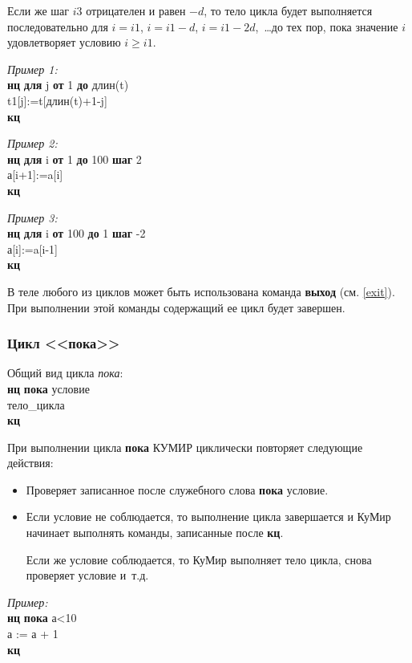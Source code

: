 Если же шаг $i3$ отрицателен и равен $-d$, то тело цикла будет выполняется последовательно для $i=i1$, $i=i1-d$, $i=i1-2d$,~\dots до тех пор, пока значение $i$ удовлетворяет условию $i \ge i1$.

\emph{Пример 1:}\\
{\sffamily
\textbf{нц} \textbf{для} j \textbf{от} 1 \textbf{до} длин(t)\\
\otstup t1[j]:=t[длин(t)+1-j]\\
\textbf{кц}
}

\emph{Пример 2:}\\
{\sffamily
\textbf{нц} \textbf{для} i \textbf{от} 1 \textbf{до} 100 \textbf{шаг} 2\\
\otstup а[i+1]:=a[i]\\
\textbf{кц}
}

\emph{Пример 3:}\\
{\sffamily
\textbf{нц} \textbf{для} i \textbf{от} 100 \textbf{до} 1 \textbf{шаг} -2\\
\otstup а[i]:=a[i-1]\\
\textbf{кц}
}

	В теле любого из циклов может быть использована команда \textbf{выход} (см. \ref{exit}). При выполнении этой команды содержащий ее цикл будет завершен.

\subsubsection[Цикл ''пока'']{Цикл <<пока>>}

Общий вид цикла \emph{пока}:\\
{\sffamily
\textbf{нц} \textbf{пока} условие\\
\otstup тело\_цикла\\
\textbf{кц}
}

При выполнении цикла \textbf{пока} КУМИР циклически повторяет следующие действия:
\begin{itemize}
\item Проверяет записанное после служебного слова \textbf{пока} условие.
\item Если условие не соблюдается, то выполнение цикла завершается и КуМир начинает выполнять команды, записанные после \textbf{кц}.

Если же условие соблюдается, то КуМир выполняет тело цикла, снова проверяет условие и~т.д.
\end{itemize}

\emph{Пример:}\\
{\sffamily
\textbf{нц} \textbf{пока} а<10\\
\otstup а := а + 1\\
\textbf{кц}
}

